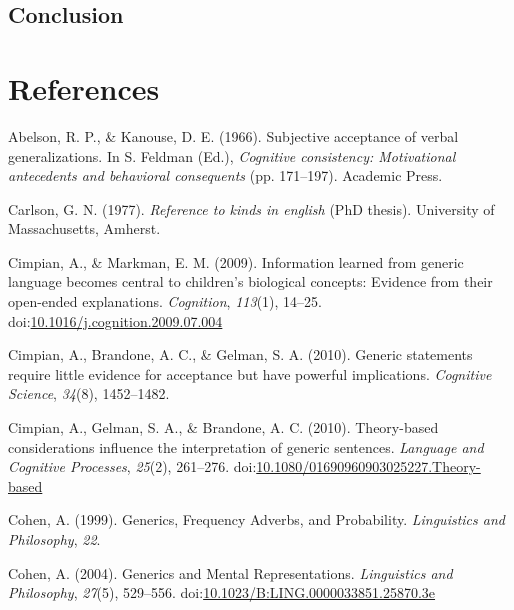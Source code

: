 \documentclass[floatsintext,doc]{apa6}
\theoremstyle{definition}
\theoremstyle{definition}
\theoremstyle{definition}
\theoremstyle{remark}
\begin{document}
\subsection{Conclusion}\label{conclusion}

\section{References}\label{references}

\setlength{\parindent}{-0.5in} \setlength{\leftskip}{0.5in}

\hypertarget{refs}{}
\hypertarget{ref-Abelson1966}{}
Abelson, R. P., \& Kanouse, D. E. (1966). Subjective acceptance of
verbal generalizations. In S. Feldman (Ed.), \emph{Cognitive
consistency: Motivational antecedents and behavioral consequents} (pp.
171--197). Academic Press.

\hypertarget{ref-Carlson1977}{}
Carlson, G. N. (1977). \emph{Reference to kinds in english}
(PhD thesis). University of Massachusetts, Amherst.

\hypertarget{ref-Cimpian2009:explanations}{}
Cimpian, A., \& Markman, E. M. (2009). Information learned from generic
language becomes central to children's biological concepts: Evidence
from their open-ended explanations. \emph{Cognition}, \emph{113}(1),
14--25.
doi:\href{https://doi.org/10.1016/j.cognition.2009.07.004}{10.1016/j.cognition.2009.07.004}

\hypertarget{ref-Cimpian2010}{}
Cimpian, A., Brandone, A. C., \& Gelman, S. A. (2010). Generic
statements require little evidence for acceptance but have powerful
implications. \emph{Cognitive Science}, \emph{34}(8), 1452--1482.

\hypertarget{ref-Cimpian2010theory}{}
Cimpian, A., Gelman, S. A., \& Brandone, A. C. (2010). Theory-based
considerations influence the interpretation of generic sentences.
\emph{Language and Cognitive Processes}, \emph{25}(2), 261--276.
doi:\href{https://doi.org/10.1080/01690960903025227.Theory-based}{10.1080/01690960903025227.Theory-based}

\hypertarget{ref-Cohen1999}{}
Cohen, A. (1999). Generics, Frequency Adverbs, and Probability.
\emph{Linguistics and Philosophy}, \emph{22}.

\hypertarget{ref-Cohen2004}{}
Cohen, A. (2004). Generics and Mental Representations. \emph{Linguistics
and Philosophy}, \emph{27}(5), 529--556.
doi:\href{https://doi.org/10.1023/B:LING.0000033851.25870.3e}{10.1023/B:LING.0000033851.25870.3e}
\end{document}
